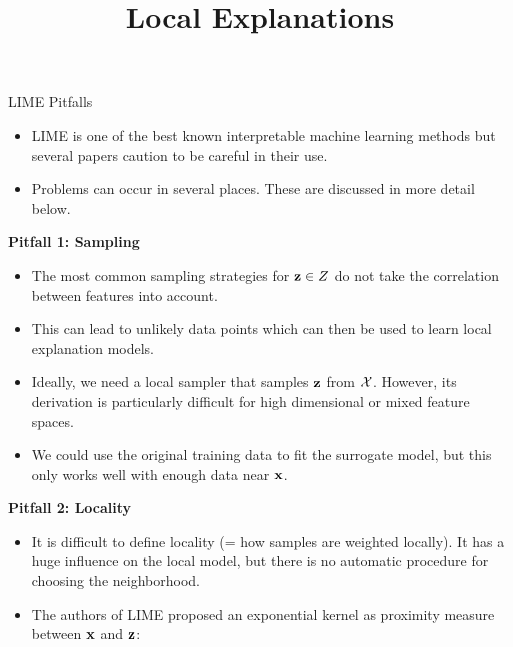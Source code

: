 \documentclass[11pt,compress,t,notes=noshow, xcolor=table]{beamer}
\title{Local Explanations}
\institute{\href{https://compstat-lmu.github.io/lecture_i2ml/}{compstat-lmu.github.io/lecture\_i2ml}}
\date{}
\begin{document}
	
	
	
	
	
	
	
	
	
	


\begin{vbframe}{LIME Pitfalls}
  \begin{itemize}
  	\item LIME is one of the best known interpretable machine learning methods but several papers caution to be careful in their use. 
  	\item Problems can occur in several places. These are discussed in more detail below. 
  \end{itemize}
	\textbf{Pitfall 1: Sampling}
	\begin{itemize}
	  \item The most common sampling strategies for $\zv \in Z$ do not take the correlation between features into account. 
      \item This can lead to unlikely data points which can then be used to learn local explanation models.
      \item Ideally, we need a local sampler that samples $\zv$ from $\Xspace$. However, its derivation is particularly difficult for high dimensional or mixed feature spaces. 
      \item We could use the original training data to fit the surrogate model, but this only works well with enough data near $\xv$.
    \end{itemize}
\framebreak
	\textbf{Pitfall 2: Locality}
	\begin{itemize} 
     \item It is difficult to define locality (= how samples are weighted locally). It has a huge influence on the local model, but there is no automatic procedure for choosing the neighborhood.
     \item The authors of LIME proposed an exponential kernel as proximity measure between $\xv$ and $\zv$:

\end{itemize}
\end{vbframe}
\end{document}
